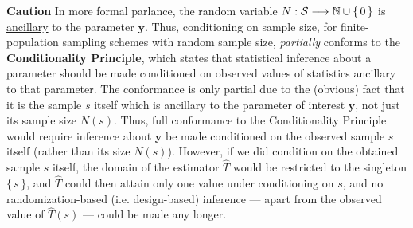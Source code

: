 \documentclass{article}
\begin{document}
\vskip 0.5cm
\noindent
\textbf{Caution}\vskip 0.1cm
\noindent
In more formal parlance, the random variable $N : \mathcal{S} \longrightarrow \mathbb{N}\cup\{\,0\,\}$
is \underline{ancillary} to the parameter $\mathbf{y}$.
Thus, conditioning on sample size, for finite-population sampling schemes with random
sample size, \emph{partially} conforms to the \textbf{Conditionality Principle},
which states that statistical inference about a parameter should be made conditioned on
observed values of statistics ancillary to that parameter.
The conformance is only partial due to the (obvious) fact that it is the sample $s$ itself
which is ancillary to the parameter of interest $\mathbf{y}$, not just its sample size $N(s)$.
Thus, full conformance to the Conditionality Principle would require inference about
$\mathbf{y}$ be made conditioned on the observed sample $s$ itself (rather than its
size $N(s)$).
However, if we did condition on the obtained sample $s$ itself, the domain of the estimator
$\widehat{T}$ would be restricted to the singleton $\{\,s\,\}$, and $\widehat{T}$ could then
attain only one value under conditioning on $s$, and no randomization-based
(i.e. design-based) inference --- apart from the observed value of $\widehat{T}(s)$ --- could
be made any longer.


%
%
%



\end{document}
